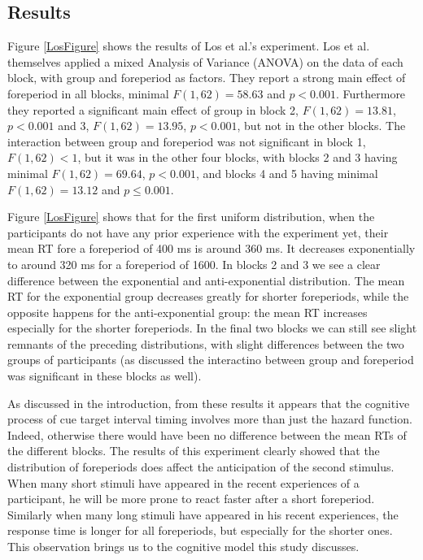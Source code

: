 \documentclass[10pt,letterpaper]{article}
\begin{document}
\subsection{Results}
Figure \ref{LosFigure} shows the results of Los et al.'s experiment. Los et al. themselves applied a mixed Analysis of Variance (ANOVA) on the data of each block, with group and foreperiod as factors. They report a strong main effect of foreperiod in all blocks, minimal $F (1, 62) = 58.63$ and $p < 0.001$. Furthermore they reported a significant main effect of group in block 2, $F (1, 62) = 13.81$, $p < 0.001$ and 3, $F(1, 62) = 13.95$, $p < 0.001$, but not in the other blocks. The interaction between group and foreperiod was not significant in block 1, $F(1, 62) < 1$, but it was in the other four blocks, with blocks 2 and 3 having minimal $F (1, 62) = 69.64$, $p < 0.001$, and blocks 4 and 5 having minimal $F (1, 62) = 13.12$ and $p \leq 0.001$.

Figure \ref{LosFigure} shows that for the first uniform distribution, when the participants do not have any prior experience with the experiment yet, their mean RT fore a foreperiod of 400 ms is around 360 ms. It decreases exponentially to around 320 ms for a foreperiod of 1600. In blocks 2 and 3 we see a clear difference between the exponential and anti-exponential distribution. The mean RT for the exponential group decreases greatly for shorter foreperiods, while the opposite happens for the anti-exponential group: the mean RT increases especially for the shorter foreperiods. In the final two blocks we can still see slight remnants of the preceding distributions, with slight differences between the two groups of participants (as discussed the interactino between group and foreperiod was significant in these blocks as well).

As discussed in the introduction, from these results it appears that the cognitive process of cue target interval timing involves more than just the hazard function. Indeed, otherwise there would have been no difference between the mean RTs of the different blocks. The results of this experiment clearly showed that the distribution of foreperiods does affect the anticipation of the second stimulus. When many short stimuli have appeared in the recent experiences of a participant, he will be more prone to react faster after a short foreperiod. Similarly when many long stimuli have appeared in his recent experiences, the response time is longer for all foreperiods, but especially for the shorter ones. This observation brings us to the cognitive model this study discusses.
\end{document}
